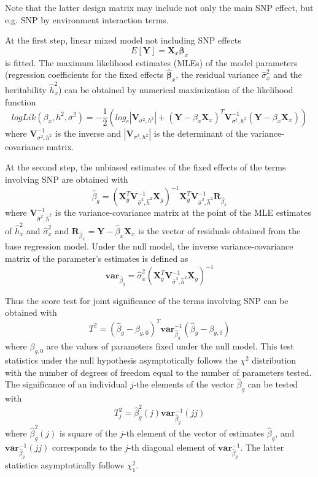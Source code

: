 \documentclass[12pt,a4paper]{article}
\begin{document}
Note that the latter design matrix may include not only the main SNP effect, but 
e.g. SNP by environment interaction terms.

At the first step, linear mixed model not including SNP effects
$$
E[\mathbf{Y}] = \mathbf{X}_x \mathbf{\beta}_x
$$
is fitted. The maximum likelihood estimates (MLEs) of the model parameters (regression coefficients for 
the fixed effects $\hat{\mathbf{\beta}}_x$, the
residual variance $\hat{\sigma}^2_x$ and the heritability $\hat{h}^2_x$) can 
be obtained by numerical maximization of the likelihood function
$$
logLik(\beta_x,h^2,\sigma^2) = -\frac{1}{2} ( log_e|\mathbf{V}_{\sigma^2,h^2}|+
(\mathbf{Y} - \beta_x \mathbf{X}_x)^T \mathbf{V}_{\sigma^2,h^2}^{-1} (\mathbf{Y} - \beta_x \mathbf{X}_x) )
$$
where $\mathbf{V}_{\sigma^2,h^2}^{-1}$ is the inverse and 
$|\mathbf{V}_{\sigma^2,h^2}|$ is the determinant of the variance-covariance matrix. 

At the second step, the unbiased estimates of the fixed effects of the terms 
involving SNP are obtained with 
$$
\hat{\beta}_g = (\mathbf{X}^T_g \mathbf{V}^{-1}_{\hat{\sigma}^2,\hat{h}^2} \mathbf{X}_g)^{-1} 
		\mathbf{X}^T_g \mathbf{V}^{-1}_{\hat{\sigma}^2,\hat{h}^2} \mathbf{R}_{\hat{\beta}_x}
$$
where $\mathbf{V}^{-1}_{\hat{\sigma}^2,\hat{h}^2}$ is the variance-covariance matrix at the point 
of the MLE estimates of $\hat{h}^2_x$ and $\hat{\sigma}^2_x$ and 
$\mathbf{R}_{\hat{\beta}_x} = \mathbf{Y} - \hat{\beta}_x \mathbf{X}_x$ is the 
vector of residuals obtained from the base regression model. Under the null 
model, the inverse variance-covariance matrix of the parameter's estimates is defined 
as
$$
\mathbf{var}_{\hat{\beta}_g} = \hat{\sigma}^2_x (\mathbf{X}^T_g \mathbf{V}^{-1}_{\hat{\sigma}^2,\hat{h}^2} \mathbf{X}_g)^{-1}
$$

Thus the score test for joint significance of the terms involving SNP can be obtained with 
$$
T^2 = (\hat{\beta}_g - \beta_{g,0})^T \mathbf{var}_{\hat{\beta}_g}^{-1} (\hat{\beta}_g - \beta_{g,0})
$$
where $\beta_{g,0}$ are the values of parameters fixed under the null model. 
This test statistics under the null hypothesis asymptotically follows the 
$\chi^2$ distribution with the number of degrees 
of freedom equal to the number of parameters tested. 
The significance of an individual $j$-the elements of the vector $\hat{\beta}_g$ can be tested with
$$
T^2_j = \hat{\beta}_{g}^2(j) \mathbf{var}_{\hat{\beta}_g}^{-1}(jj)
$$
where $\hat{\beta}_{g}^2(j)$ is square of the $j$-th element of the vector of estimates $\hat{\beta}_{g}$, 
and $\mathbf{var}_{\hat{\beta}_g}^{-1}(jj)$ corresponds to the $j$-th diagonal element of 
$\mathbf{var}_{\hat{\beta}_g}^{-1}$.
The latter statistics asymptotically follows $\chi^2_1$.
\end{document}
